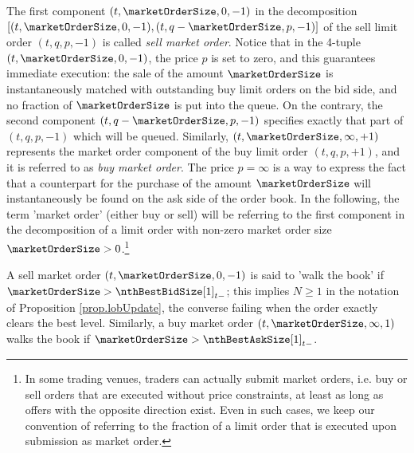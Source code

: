 The first component $(t,\marketOrderSize,0,-1)$
in the decomposition $[(t,\marketOrderSize,0,-1),(t,q-\marketOrderSize,p,-1) ]$
of the sell limit order $(t,q,p,-1)$ is called \emph{sell market order}.
Notice that in the 4-tuple $(t,\marketOrderSize,0,-1)$, the price $p$ is set to zero,
and this guarantees immediate execution:
the sale of the amount $\marketOrderSize$ is instantaneously matched
with outstanding buy limit orders on the bid side,
and no fraction of $\marketOrderSize$ is put into the queue.
On the contrary,
the second component $(t,q-\marketOrderSize,p,-1)$ specifies exactly that part of $(t,q,p,-1)$
which will be queued.
Similarly, $(t,\marketOrderSize,\infty,+1)$ represents the market order component of
the buy limit order $(t,q,p,+1)$,
and it is referred to as \emph{buy market order}.
The price $p=\infty$ is a way to express the fact that a counterpart
for the purchase of the amount $\marketOrderSize$
will instantaneously be found on the ask side of the order book.
In the following, the term 'market order' (either buy or sell) will be referring
to the first component in the decomposition of a limit order
with non-zero market order size $\marketOrderSize >0$.\footnote{
In some trading venues, traders can actually submit market orders,
i.e. buy or sell orders that are executed without price constraints,
at least as long as offers with the opposite direction exist.
Even in such cases, we keep our convention of referring to the fraction of a limit order
that is executed upon submission as market order.}

A sell market order $(t,\marketOrderSize,0,-1)$ is said to 'walk the book'
if $\marketOrderSize > \nthBestBidSize[1]_{t-}$;
this implies $N\geq 1 $ in the notation of Proposition \ref{prop.lobUpdate},
the converse failing when the order exactly clears the best level.
Similarly, a buy market order $(t,\marketOrderSize,\infty,1)$ walks the book
if $\marketOrderSize > \nthBestAskSize[1]_{t-}$.

